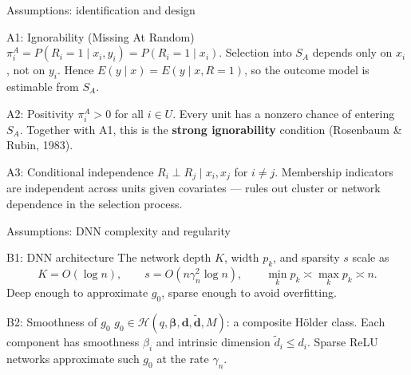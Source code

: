 \documentclass[aspectratio=169,11pt]{beamer}
\begin{document}
\begin{frame}{Assumptions: identification and design}
\begin{block}{A1: Ignorability (Missing At Random)}
$\pi_i^A=P(R_i=1\mid x_i,y_i)=P(R_i=1\mid x_i)$. Selection into $S_A$ depends only on $x_i$, not on $y_i$. Hence $E(y\mid x)=E(y\mid x,R=1)$, so the outcome model is estimable from $S_A$.
\end{block}
\begin{block}{A2: Positivity}
$\pi_i^A>0$ for all $i\in U$. Every unit has a nonzero chance of entering $S_A$. Together with A1, this is the \textbf{strong ignorability} condition (Rosenbaum \& Rubin, 1983).
\end{block}
\begin{block}{A3: Conditional independence}
$R_i\perp R_j\mid x_i,x_j$ for $i\neq j$. Membership indicators are independent across units given covariates — rules out cluster or network dependence in the selection process.
\end{block}
\end{frame}

\begin{frame}{Assumptions: DNN complexity and regularity}
\begin{block}{B1: DNN architecture}
The network depth $K$, width $p_k$, and sparsity $s$ scale as
\[
K=O(\log n),\qquad s=O(n\gamma_n^2\log n),\qquad \min_k p_k\asymp\max_k p_k\asymp n.
\]
Deep enough to approximate $g_0$, sparse enough to avoid overfitting.
\end{block}
\begin{block}{B2: Smoothness of $g_0$}
$g_0\in\mathcal{H}(q,\boldsymbol{\beta},\mathbf{d},\tilde{\mathbf{d}},M)$: a composite H\"older class. Each component has smoothness $\beta_i$ and intrinsic dimension $\tilde{d}_i\le d_i$. Sparse ReLU networks approximate such $g_0$ at the rate $\gamma_n$.
\end{block}
\end{frame}
\end{document}
